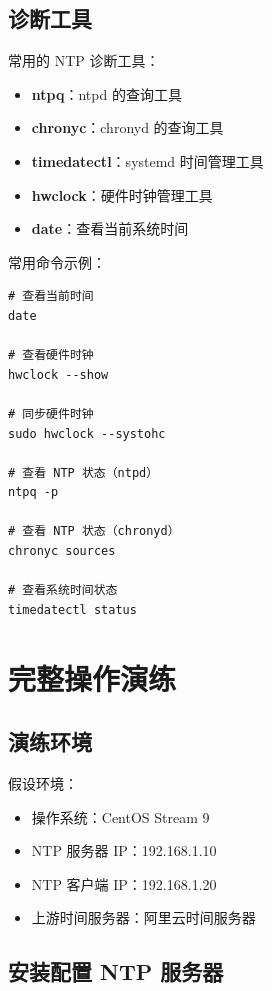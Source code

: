 \documentclass[12pt,UTF8]{ctexbook}
\begin{document}
\section{诊断工具}
\label{sec:diagnostic_tools}

常用的 NTP 诊断工具：

\begin{itemize}
    \item \textbf{ntpq}：ntpd 的查询工具
    \item \textbf{chronyc}：chronyd 的查询工具
    \item \textbf{timedatectl}：systemd 时间管理工具
    \item \textbf{hwclock}：硬件时钟管理工具
    \item \textbf{date}：查看当前系统时间
\end{itemize}

常用命令示例：
\begin{verbatim}
# 查看当前时间
date

# 查看硬件时钟
hwclock --show

# 同步硬件时钟
sudo hwclock --systohc

# 查看 NTP 状态（ntpd）
ntpq -p

# 查看 NTP 状态（chronyd）
chronyc sources

# 查看系统时间状态
timedatectl status
\end{verbatim}

\chapter{完整操作演练}
\label{chap:practice}

\section{演练环境}
\label{sec:practice_env}

假设环境：
\begin{itemize}
    \item 操作系统：CentOS Stream 9
    \item NTP 服务器 IP：192.168.1.10
    \item NTP 客户端 IP：192.168.1.20
    \item 上游时间服务器：阿里云时间服务器
\end{itemize}

\section{安装配置 NTP 服务器}
\label{sec:practice_server}
\end{document}
